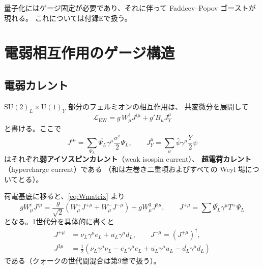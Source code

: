 \documentclass[uplatex,dvipdfmx,a4paper,11pt,openany]{jsbook}
\newcommand{\term}[2]{\textbf{#1}（#2）}
\numberwithin{equation}{chapter}
\theoremstyle{definition}
\theoremstyle{plain}
\theoremstyle{remark}
\newcommand{\Lag}{\mathcal{L}}
\newcommand{\SU}{\mathrm{SU}}
\newcommand{\U}{\mathrm{U}}
\begin{document}
量子化にはゲージ固定が必要であり、それに伴って Faddeev--Popov ゴーストが現れる。
これについては付録Eで扱う。
\section{電弱相互作用のゲージ構造}
\subsection{電弱カレント}
$\SU(2)_L\times\U(1)_Y$ 部分のフェルミオンの相互作用は、
共変微分を展開して
\begin{equation}
\Lag_{\mathrm{EW}}
=g\,W^i_\mu J^{i\mu}+g'B_\mu J^\mu_Y
\end{equation}
と書ける。ここで
\begin{equation}
J^{i\mu}=\sum_{\Psi_L}\overline{\Psi_L}\gamma^\mu\frac{\sigma^i}{2}\Psi_L,
\qquad
J^\mu_Y=\sum_\psi\bar\psi\gamma^\mu\frac{Y}{2}\psi
\end{equation}
はそれぞれ\term{弱アイソスピンカレント}{weak isospin current}、
\term{超電荷カレント}{hypercharge current}である
（和は左巻き二重項およびすべての Weyl 場についてとる）。

荷電基底に移ると、\eqref{eq:Wmatrix} より
\begin{equation}
gW^i_\mu J^{i\mu}
=\frac{g}{\sqrt2}\left(W^+_\mu J^{+\mu}+W^-_\mu J^{-\mu}\right)+gW^3_\mu J^{3\mu},
\qquad
J^{+\mu}=\sum\overline{\Psi_L}\gamma^\mu T^+\Psi_L
\end{equation}
となる。1世代分を具体的に書くと
\begin{align}
J^{+\mu}&=\overline{\nu_L}\gamma^\mu e_L+\overline{u_L}\gamma^\mu d_L,
\qquad J^{-\mu}=(J^{+\mu})^\dagger,\\
J^{3\mu}&=\frac12\left(\overline{\nu_L}\gamma^\mu\nu_L-\overline{e_L}\gamma^\mu e_L
+\overline{u_L}\gamma^\mu u_L-\overline{d_L}\gamma^\mu d_L\right)
\end{align}
である（クォークの世代間混合は第9章で扱う）。
\end{document}
